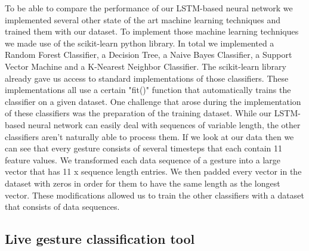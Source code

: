 \documentclass[runningheads]{llncs}
\begin{document}
To be able to compare the performance of our LSTM-based neural network we implemented several other state of the art machine learning techniques and trained them with our dataset. To implement those machine learning techniques we made use of the scikit-learn python library. In total we implemented a Random Forest Classifier, a Decision Tree, a Naive Bayes Classifier, a Support Vector Machine and a K-Nearest Neighbor Classifier. The scikit-learn library already gave us access to standard implementations of those classifiers. These implementations all use a certain "fit()" function that automatically trains the classifier on a given dataset. One challenge that arose during the implementation of these classifiers was the preparation of the training dataset. While our LSTM-based neural network can easily deal with sequences of variable length, the other classifiers aren't naturally able to process them. If we look at our data then we can see that every gesture consists of several timesteps that each contain 11 feature values. We transformed each data sequence of a gesture into a large vector that has 11 x sequence length entries. We then padded every vector in the dataset with zeros in order for them to have the same length as the longest vector. These modifications allowed us to train the other classifiers with a dataset that consists of data sequences.

\subsection{Live gesture classification tool}
\end{document}
